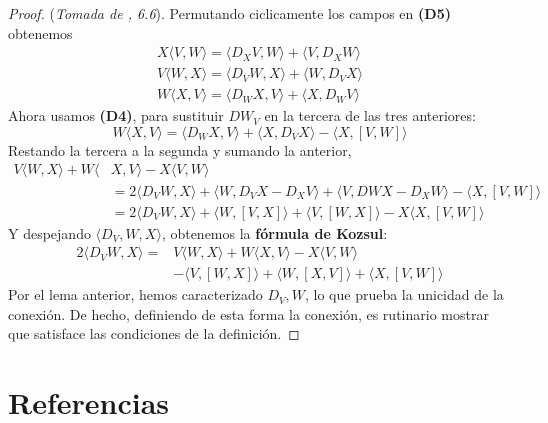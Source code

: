 \documentclass[spanish]{book}
\theoremstyle{definition}
\begin{document}
	
	\begin{proof}
		(\textit{Tomada de \cite{Loring-dif}, 6.6}). Permutando ciclicamente los campos en \textbf{(D5)} obtenemos
		\begin{align*}
			X\langle V,W\rangle=\langle D_XV,W\rangle+\langle V,D_XW\rangle\\
			V\langle W,X\rangle=\langle D_VW,X\rangle+\langle W,D_VX\rangle\\
			W\langle X,V\rangle=\langle D_WX,V\rangle+\langle X,D_WV\rangle
		\end{align*}
		Ahora usamos \textbf{(D4)}, para sustituir $DW_V$ en la tercera de las tres anteriores:
			\[W\langle X,V\rangle=\langle D_WX,V\rangle+\langle X,D_VX\rangle-\langle X,[V,W]\rangle\]
		Restando la tercera a la segunda y sumando la anterior,
		\begin{align*}
			V\langle W,X\rangle+W\langle &X,V\rangle-X\langle V,W\rangle\\
			&=2\langle D_VW,X\rangle+\langle W,D_VX-D_XV\rangle+\langle V,DWX-D_XW\rangle-\langle X,[V,W]\rangle\\
			&=2\langle D_VW,X\rangle+\langle W,[V,X]\rangle +\langle V,[W,X]\rangle-X\langle X,[V,W]\rangle
		\end{align*}
		Y despejando $\langle D_V,W,X\rangle$, obtenemos la \textbf{fórmula de Kozsul}:
	\begin{align*}
		2\langle D_VW,X\rangle=&V\langle W,X\rangle+W\langle X,V\rangle-X\langle V,W\rangle\\
		&-\langle V,[W,X]\rangle+\langle W,[X,V]\rangle+\langle X,[V,W]\rangle
	\end{align*}
	Por el lema anterior, hemos caracterizado $D_V,W$, lo que prueba la unicidad de la conexión. De hecho, definiendo de esta forma la conexión, es rutinario mostrar que satisface las condiciones de la definición.
	\end{proof}

	\chapter{Referencias}
	\printbibliography[heading=none]
	
\end{document}
